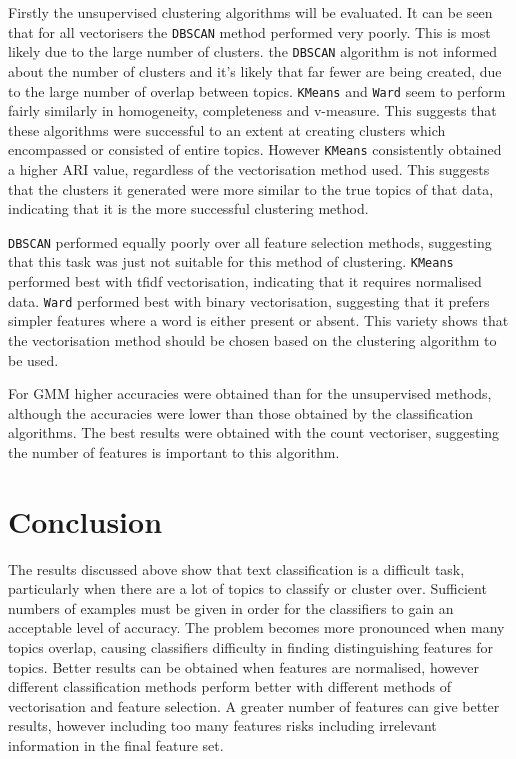 \documentclass{article}
\begin{document}
Firstly the unsupervised clustering algorithms will be evaluated. It can be seen that for all vectorisers the \verb|DBSCAN| method performed very poorly. This is most likely due to the large number of clusters. the \verb|DBSCAN| algorithm is not informed about the number of clusters and it's likely that far fewer are being created, due to the large number of overlap between topics. \verb|KMeans| and \verb|Ward| seem to perform fairly similarly in homogeneity, completeness and v-measure. This suggests that these algorithms were successful to an extent at creating clusters which encompassed or consisted of entire topics. However \verb|KMeans| consistently obtained a higher ARI value, regardless of the vectorisation method used. This suggests that the clusters it generated were more similar to the true topics of that data, indicating that it is the more successful clustering method.

\verb|DBSCAN| performed equally poorly over all feature selection methods, suggesting that this task was just not suitable for this method of clustering. \verb|KMeans| performed best with tfidf vectorisation, indicating that it requires normalised data. \verb|Ward| performed best with binary vectorisation, suggesting that it prefers simpler features where a word is either present or absent. This variety shows that the vectorisation method should be chosen based on the clustering algorithm to be used.

For GMM higher accuracies were obtained than for the unsupervised methods, although the accuracies were lower than those obtained by the classification algorithms. The best results were obtained with the count vectoriser, suggesting the number of features is important to this algorithm.

\section{Conclusion}
The results discussed above show that text classification is a difficult task, particularly when there are a lot of topics to classify or cluster over. Sufficient numbers of examples must be given in order for the classifiers to gain an acceptable level of accuracy. The problem becomes more pronounced when many topics overlap, causing classifiers difficulty in finding distinguishing features for topics. Better results can be obtained when features are normalised, however different classification methods perform better with different methods of vectorisation and feature selection. A greater number of features can give better results, however including too many features risks including irrelevant information in the final feature set.
\end{document}

